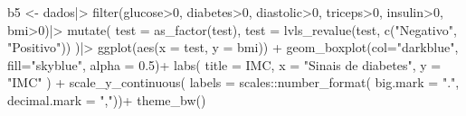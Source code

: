 \documentclass[
  letterpaper,
  DIV=11,
  numbers=noendperiod]{scrartcl}
\newenvironment{Shaded}{\begin{snugshade}}{\end{snugshade}}
\newcommand{\AttributeTok}[1]{\textcolor[rgb]{0.40,0.45,0.13}{#1}}
\newcommand{\DecValTok}[1]{\textcolor[rgb]{0.68,0.00,0.00}{#1}}
\newcommand{\FloatTok}[1]{\textcolor[rgb]{0.68,0.00,0.00}{#1}}
\newcommand{\FunctionTok}[1]{\textcolor[rgb]{0.28,0.35,0.67}{#1}}
\newcommand{\NormalTok}[1]{\textcolor[rgb]{0.00,0.23,0.31}{#1}}
\newcommand{\OtherTok}[1]{\textcolor[rgb]{0.00,0.23,0.31}{#1}}
\newcommand{\SpecialCharTok}[1]{\textcolor[rgb]{0.37,0.37,0.37}{#1}}
\newcommand{\StringTok}[1]{\textcolor[rgb]{0.13,0.47,0.30}{#1}}
\begin{document}
\begin{Shaded}
\begin{Highlighting}[]
\NormalTok{b5 }\OtherTok{\textless{}{-}}\NormalTok{ dados}\SpecialCharTok{|\textgreater{}}
  \FunctionTok{filter}\NormalTok{(glucose}\SpecialCharTok{\textgreater{}}\DecValTok{0}\NormalTok{, diabetes}\SpecialCharTok{\textgreater{}}\DecValTok{0}\NormalTok{, diastolic}\SpecialCharTok{\textgreater{}}\DecValTok{0}\NormalTok{,}
\NormalTok{         triceps}\SpecialCharTok{\textgreater{}}\DecValTok{0}\NormalTok{, insulin}\SpecialCharTok{\textgreater{}}\DecValTok{0}\NormalTok{, bmi}\SpecialCharTok{\textgreater{}}\DecValTok{0}\NormalTok{)}\SpecialCharTok{|\textgreater{}}
  \FunctionTok{mutate}\NormalTok{(}
    \AttributeTok{test =} \FunctionTok{as\_factor}\NormalTok{(test),}
    \AttributeTok{test =} \FunctionTok{lvls\_revalue}\NormalTok{(test, }\FunctionTok{c}\NormalTok{(}\StringTok{"Negativo"}\NormalTok{, }\StringTok{"Positivo"}\NormalTok{))}
\NormalTok{  )}\SpecialCharTok{|\textgreater{}}
  \FunctionTok{ggplot}\NormalTok{(}\FunctionTok{aes}\NormalTok{(}\AttributeTok{x =}\NormalTok{ test, }\AttributeTok{y =}\NormalTok{ bmi)) }\SpecialCharTok{+}
  \FunctionTok{geom\_boxplot}\NormalTok{(}\AttributeTok{col=}\StringTok{"darkblue"}\NormalTok{, }\AttributeTok{fill=}\StringTok{"skyblue"}\NormalTok{, }\AttributeTok{alpha =} \FloatTok{0.5}\NormalTok{)}\SpecialCharTok{+}
  \FunctionTok{labs}\NormalTok{(}
    \AttributeTok{title =} \StringTok{\textquotesingle{}IMC\textquotesingle{}}\NormalTok{,}
    \AttributeTok{x =} \StringTok{"Sinais de diabetes"}\NormalTok{,}
    \AttributeTok{y =} \StringTok{"IMC"}
\NormalTok{  ) }\SpecialCharTok{+}
  \FunctionTok{scale\_y\_continuous}\NormalTok{(}
    \AttributeTok{labels =}\NormalTok{ scales}\SpecialCharTok{::}\FunctionTok{number\_format}\NormalTok{(}
      \AttributeTok{big.mark =} \StringTok{"."}\NormalTok{,}
      \AttributeTok{decimal.mark =} \StringTok{","}\NormalTok{))}\SpecialCharTok{+}
  \FunctionTok{theme\_bw}\NormalTok{()}


\end{Highlighting}
\end{Shaded}
\end{document}

